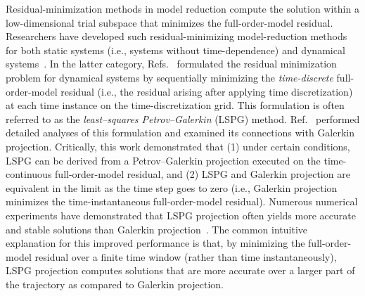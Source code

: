 \documentclass[3p,computermodern,10pt]{elsarticle}
\begin{document}
Residual-minimization methods in model reduction compute the solution within a
low-dimensional trial subspace that minimizes the full-order-model residual.
Researchers have developed such residual-minimizing model-reduction methods
for both static systems (i.e., systems without time-dependence)
\cite{legresley_1,legresley_2,legresley_3,bui_resmin_steady,rovas_thesis,carlberg_thesis,bui_thesis}
and dynamical
systems~\cite{bui_thesis,bui_unsteady,carlberg_thesis,carlberg_gnat,carlberg_lspg,carlberg_lspg_v_galerkin}.
In the latter category,
Refs.~\cite{bui_thesis,bui_unsteady,carlberg_thesis,carlberg_gnat,carlberg_lspg}
formulated the residual minimization problem for dynamical systems by
sequentially minimizing the \textit{time-discrete} full-order-model residual
(i.e., the residual arising after applying time discretization) at each time
instance on the time-discretization grid. This formulation is often referred
to as the \textit{least--squares Petrov--Galerkin} (LSPG) method.
Ref.~\cite{carlberg_lspg_v_galerkin} performed detailed analyses of this
formulation and examined its connections with Galerkin projection. Critically,
this work demonstrated that (1) under certain conditions, LSPG can be derived
from a Petrov--Galerkin projection executed on the time-continuous
full-order-model residual, and (2) LSPG and Galerkin projection are equivalent
in the limit as the time step goes to zero (i.e., Galerkin projection
minimizes the time-instantaneous full-order-model residual). Numerous
numerical experiments have demonstrated that LSPG projection often yields more
accurate and stable solutions than Galerkin
projection~\cite{bui_thesis,carlberg_lspg_v_galerkin,carlberg_gnat,carlberg_thesis,parish_apg}.
The common intuitive explanation for this improved performance is that, by
minimizing the full-order-model residual over a finite time window (rather
than time instantaneously), LSPG projection computes solutions that are more
accurate over a larger part of the trajectory as compared to Galerkin projection.
\end{document}
